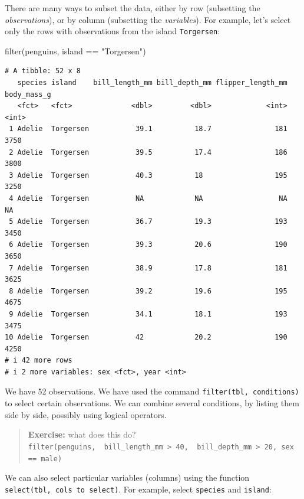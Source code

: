 \documentclass[
  letterpaper,
  DIV=11,
  numbers=noendperiod]{scrreprt}
\newenvironment{Shaded}{\begin{snugshade}}{\end{snugshade}}
\newcommand{\FunctionTok}[1]{\textcolor[rgb]{0.28,0.35,0.67}{#1}}
\newcommand{\NormalTok}[1]{\textcolor[rgb]{0.00,0.23,0.31}{#1}}
\newcommand{\SpecialCharTok}[1]{\textcolor[rgb]{0.37,0.37,0.37}{#1}}
\newcommand{\StringTok}[1]{\textcolor[rgb]{0.13,0.47,0.30}{#1}}
\begin{document}
There are many ways to subset the data, either by row (subsetting the
\emph{observations}), or by column (subsetting the \emph{variables}).
For example, let's select only the rows with observations from the
island \texttt{Torgersen}:

\begin{Shaded}
\begin{Highlighting}[]
\FunctionTok{filter}\NormalTok{(penguins, island }\SpecialCharTok{==} \StringTok{"Torgersen"}\NormalTok{)}
\end{Highlighting}
\end{Shaded}

\begin{verbatim}
# A tibble: 52 x 8
   species island    bill_length_mm bill_depth_mm flipper_length_mm body_mass_g
   <fct>   <fct>              <dbl>         <dbl>             <int>       <int>
 1 Adelie  Torgersen           39.1          18.7               181        3750
 2 Adelie  Torgersen           39.5          17.4               186        3800
 3 Adelie  Torgersen           40.3          18                 195        3250
 4 Adelie  Torgersen           NA            NA                  NA          NA
 5 Adelie  Torgersen           36.7          19.3               193        3450
 6 Adelie  Torgersen           39.3          20.6               190        3650
 7 Adelie  Torgersen           38.9          17.8               181        3625
 8 Adelie  Torgersen           39.2          19.6               195        4675
 9 Adelie  Torgersen           34.1          18.1               193        3475
10 Adelie  Torgersen           42            20.2               190        4250
# i 42 more rows
# i 2 more variables: sex <fct>, year <int>
\end{verbatim}

We have 52 observations. We have used the command
\texttt{filter(tbl,\ conditions)} to select certain observations. We can
combine several conditions, by listing them side by side, possibly using
logical operators.

\begin{quote}
\textbf{Exercise:} what does this do?
\texttt{filter(penguins,\ \ bill\_length\_mm\ \textgreater{}\ 40,\ \ bill\_depth\_mm\ \textgreater{}\ 20,\ sex\ ==\ male)}
\end{quote}

We can also select particular variables (columns) using the function
\texttt{select(tbl,\ cols\ to\ select)}. For example, select
\texttt{species} and \texttt{island}:
\end{document}
